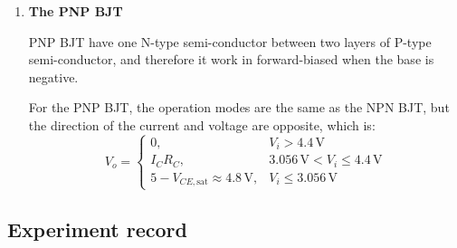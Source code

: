 \begin{enumerate}[a]
            \item \textbf{The PNP BJT}\par
                PNP BJT have one N-type semi-conductor between two layers of P-type semi-conductor, and therefore it work in forward-biased when the base is negative.\par

                For the PNP BJT, the operation modes are the same as the NPN BJT, but the direction of the current and voltage are opposite, which is:
                \begin{equation}
                    V_o =
                        \begin{cases}
                            0, & V_i > 4.4 \, \text{V} \\ 
                            I_C R_C, & 3.056 \, \text{V} < V_i \leq 4.4 \, \text{V} \\ 
                            5 - V_{CE,\text{sat}} \approx 4.8 \, \text{V}, & V_i \leq 3.056 \, \text{V}
                        \end{cases}
                \end{equation}
        
        \end{enumerate}


\subsection{Experiment record}
